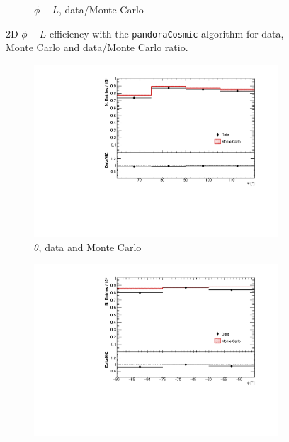 \documentclass[a4paper]{scrartcl}
\begin{document}
\begin{figure}[htbp]
\begin{center}
\begin{subfigure}{0.52\textwidth}
\caption{$\phi - L$, data/Monte Carlo}\label{fig:2d_cry_ratio_3}
\end{subfigure}
\caption{2D $\phi - L$ efficiency with the \texttt{pandoraCosmic} algorithm for data, Monte Carlo and data/Monte Carlo ratio.} \label{fig:cry_mc_2d_3}
\end{center}
\end{figure}


\begin{figure}[htbp]
\begin{center}
\begin{subfigure}{0.52\textwidth}
\includegraphics[width=\linewidth]{theta_cry.pdf}
\caption{$\theta$, data and Monte Carlo} \label{fig:1d_cry}
\end{subfigure}\begin{subfigure}{0.52\textwidth}
\includegraphics[width=\linewidth]{phi_cry.pdf}

\end{subfigure}
\end{center}
\end{figure}
\end{document}
